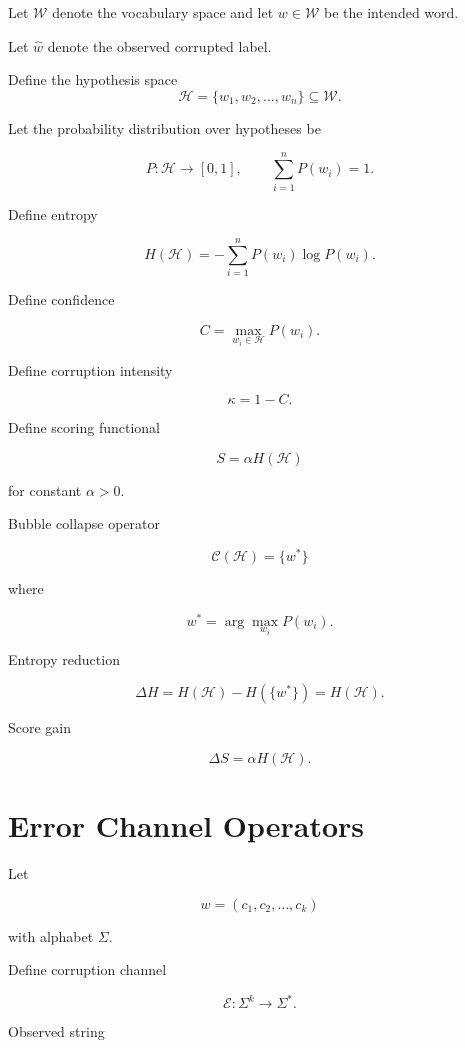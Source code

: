 \documentclass[11pt]{article}
\begin{document}
Let $\mathcal{W}$ denote the vocabulary space and let $w \in \mathcal{W}$ be the intended word.

Let $\hat{w}$ denote the observed corrupted label.

Define the hypothesis space
\[
\mathcal{H} = \{ w_1, w_2, \dots, w_n \} \subseteq \mathcal{W}.
\]

Let the probability distribution over hypotheses be

\[
P : \mathcal{H} \to [0,1], \qquad
\sum_{i=1}^{n} P(w_i) = 1.
\]

Define entropy

\[
H(\mathcal{H}) =
-\sum_{i=1}^{n} P(w_i)\log P(w_i).
\]

Define confidence

\[
C = \max_{w_i \in \mathcal{H}} P(w_i).
\]

Define corruption intensity

\[
\kappa = 1 - C.
\]

Define scoring functional

\[
S = \alpha H(\mathcal{H})
\]

for constant $\alpha > 0$.

Bubble collapse operator

\[
\mathcal{C}(\mathcal{H}) = \{w^*\}
\]

where

\[
w^* = \arg\max_{w_i} P(w_i).
\]

Entropy reduction

\[
\Delta H =
H(\mathcal{H}) - H(\{w^*\}) = H(\mathcal{H}).
\]

Score gain

\[
\Delta S = \alpha H(\mathcal{H}).
\]


\section{Error Channel Operators}

Let

\[
w = (c_1,c_2,\dots,c_k)
\]

with alphabet $\Sigma$.

Define corruption channel

\[
\mathcal{E} : \Sigma^k \to \Sigma^*.
\]

Observed string
\end{document}
